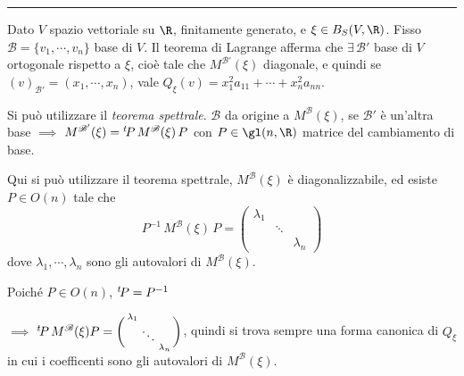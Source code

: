 
\rule{7em}{.4pt}

Dato $ V $ spazio vettoriale su $ \R$, finitamente generato, e $ \xi \in B_{S}(V, \R)  $. Fisso $ \mathscr{B}=\{v_1, \cdots,v_{n}\} $ base di $ V $. Il teorema di Lagrange afferma che $ \exists\, \mathscr{B}' $ base di $ V $ ortogonale rispetto a $ \xi $, cioè tale che $ M^{ \mathscr{B}'}(\xi) $ diagonale, e quindi se $ (v)_{ \mathscr{B}'}=(x_1, \cdots, x_{n} ) $, vale $ Q_{\xi}(v)=x_1^{2}a_{11}+\cdots+ x_{n}^{2}a_{nn}    $.

Si può utilizzare il \textit{teorema spettrale}. $ \mathscr{B} $ da origine a $ M^{ \mathscr{B}}(\xi) $, se $ \mathscr{B}' $ è un'altra base $\implies$ $ M^{ \mathscr{B}'}(\xi)=\null^{t}\!P\,M^{ \mathscr{B}}(\xi)\, P $ con $ P \in \gl(n, \R) $ matrice del cambiamento di base. 

Qui si può utilizzare il teorema spettrale, $ M^{ \mathscr{B}}(\xi) $ è diagonalizzabile, ed esiste $ P \in O(n) $ tale che \[P^{-1}\, M^{ \mathscr{B}}(\xi)\,P=\begin{pmatrix}
    \lambda_1 & & \\
    & \ddots &\\
    & & \lambda_{n} 
\end{pmatrix}\] dove $ \lambda_1, \cdots, \lambda_{n}  $ sono gli autovalori di $ M^{ \mathscr{B}}(\xi) $. 

Poiché $ P \in O(n) $, $ \null^{t}\!P=P^{-1} $ 

$\implies$ $ \null^{t}\!P\,M^{ \mathscr{B}}(\xi) P = \biggl(\begin{smallmatrix}
    \lambda_1 & & \\
    & \ddots &\\
    & & \lambda_{n} 
\end{smallmatrix}\biggr) $, quindi si trova sempre una forma canonica di $ Q_{\xi}  $ in cui i coefficenti sono gli autovalori di $ M^{ \mathscr{B}}(\xi) $.


